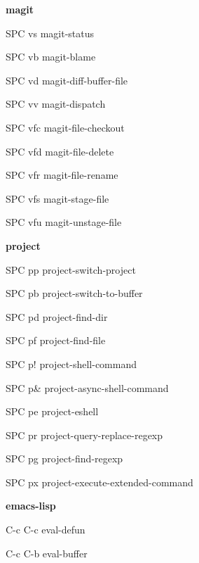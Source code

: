 \documentclass[10pt]{article}
\renewcommand\subsection[1]{\smallskip\par\textbf{\color{heading}#1}}
\begin{document}
\begin{CJK}{UTF8}{gbsn}
\begin{multicols}{3}
  \subsection{magit}
  \begin{keylist}
  \item[SPC vs] magit-status
  \item[SPC vb] magit-blame
  \item[SPC vd] magit-diff-buffer-file
  \item[SPC vv] magit-dispatch
  \item[SPC vfc] magit-file-checkout
  \item[SPC vfd] magit-file-delete
  \item[SPC vfr] magit-file-rename
  \item[SPC vfs] magit-stage-file
  \item[SPC vfu] magit-unstage-file
  \end{keylist}

  \subsection{project}
  \begin{keylist}
  \item[SPC pp] project-switch-project
  \item[SPC pb] project-switch-to-buffer
  \item[SPC pd] project-find-dir
  \item[SPC pf] project-find-file
  \item[SPC p!] project-shell-command
  \item[SPC p\&] project-async-shell-command
  \item[SPC pe] project-eshell
  \item[SPC pr] project-query-replace-regexp
  \item[SPC pg] project-find-regexp
  \item[SPC px] project-execute-extended-command
  \end{keylist}

  \subsection{emacs-lisp}
  \begin{keylist}
  \item[C-c C-c] eval-defun
  \item[C-c C-b] eval-buffer
  \end{keylist}


\end{multicols}
\end{CJK}
\end{document}
